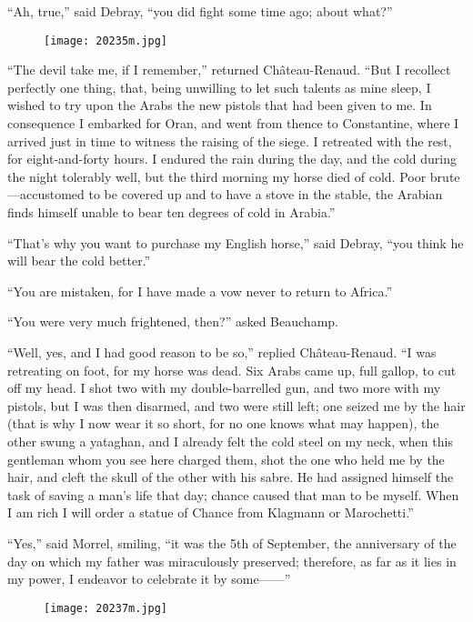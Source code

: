 “Ah, true,” said Debray, “you did fight some time ago; about what?”

\begin{figure}[ht]
\texttt{[image: 20235m.jpg]}
\end{figure}

“The devil take me, if I remember,” returned Château-Renaud. “But I
recollect perfectly one thing, that, being unwilling to let such
talents as mine sleep, I wished to try upon the Arabs the new pistols
that had been given to me. In consequence I embarked for Oran, and went
from thence to Constantine, where I arrived just in time to witness the
raising of the siege. I retreated with the rest, for eight-and-forty
hours. I endured the rain during the day, and the cold during the night
tolerably well, but the third morning my horse died of cold. Poor
brute—accustomed to be covered up and to have a stove in the stable,
the Arabian finds himself unable to bear ten degrees of cold in
Arabia.”

“That’s why you want to purchase my English horse,” said Debray, “you
think he will bear the cold better.”

“You are mistaken, for I have made a vow never to return to Africa.”

“You were very much frightened, then?” asked Beauchamp.

“Well, yes, and I had good reason to be so,” replied Château-Renaud. “I
was retreating on foot, for my horse was dead. Six Arabs came up, full
gallop, to cut off my head. I shot two with my double-barrelled gun,
and two more with my pistols, but I was then disarmed, and two were
still left; one seized me by the hair (that is why I now wear it so
short, for no one knows what may happen), the other swung a yataghan,
and I already felt the cold steel on my neck, when this gentleman whom
you see here charged them, shot the one who held me by the hair, and
cleft the skull of the other with his sabre. He had assigned himself
the task of saving a man’s life that day; chance caused that man to be
myself. When I am rich I will order a statue of Chance from Klagmann or
Marochetti.”

“Yes,” said Morrel, smiling, “it was the 5th of September, the
anniversary of the day on which my father was miraculously preserved;
therefore, as far as it lies in my power, I endeavor to celebrate it by
some——”

\begin{figure}[h]
\texttt{[image: 20237m.jpg]}
\end{figure}

